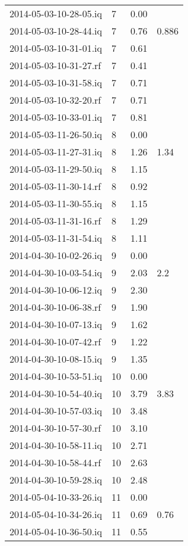 \begin{center}
\begin{longtable}{@{}l l l l@{}}
		2014-05-03-10-28-05.iq & 7 & 0.00 &  \\ 
		2014-05-03-10-28-44.iq & 7 & 0.76 & 0.886 \\ 
		2014-05-03-10-31-01.iq & 7 & 0.61 &  \\ 
		2014-05-03-10-31-27.rf & 7 & 0.41 &  \\ 
		2014-05-03-10-31-58.iq & 7 & 0.71 &  \\ 
		2014-05-03-10-32-20.rf & 7 & 0.71 &  \\ 
		2014-05-03-10-33-01.iq & 7 & 0.81 &  \\ 
		2014-05-03-11-26-50.iq & 8 & 0.00 &  \\ 
		2014-05-03-11-27-31.iq & 8 & 1.26 & 1.34 \\ 
		2014-05-03-11-29-50.iq & 8 & 1.15 &  \\ 
		2014-05-03-11-30-14.rf & 8 & 0.92 &  \\ 
		2014-05-03-11-30-55.iq & 8 & 1.15 &  \\ 
		2014-05-03-11-31-16.rf & 8 & 1.29 &  \\ 
		2014-05-03-11-31-54.iq & 8 & 1.11 &  \\ 
		2014-04-30-10-02-26.iq & 9 & 0.00 &  \\ 
		2014-04-30-10-03-54.iq & 9 & 2.03 & 2.2 \\ 
		2014-04-30-10-06-12.iq & 9 & 2.30 &  \\ 
		2014-04-30-10-06-38.rf & 9 & 1.90 &  \\ 
		2014-04-30-10-07-13.iq & 9 & 1.62 &  \\ 
		2014-04-30-10-07-42.rf & 9 & 1.22 &  \\ 
		2014-04-30-10-08-15.iq & 9 & 1.35 &  \\ 
		2014-04-30-10-53-51.iq & 10 & 0.00 &  \\ 
		2014-04-30-10-54-40.iq & 10 & 3.79 & 3.83 \\ 
		2014-04-30-10-57-03.iq & 10 & 3.48 &  \\ 
		2014-04-30-10-57-30.rf & 10 & 3.10 &  \\ 
		2014-04-30-10-58-11.iq & 10 & 2.71 &  \\ 
		2014-04-30-10-58-44.rf & 10 & 2.63 &  \\ 
		2014-04-30-10-59-28.iq & 10 & 2.48 &  \\ 
		2014-05-04-10-33-26.iq & 11 & 0.00 &  \\ 
		2014-05-04-10-34-26.iq & 11 & 0.69 & 0.76 \\ 
		2014-05-04-10-36-50.iq & 11 & 0.55 &  \\ 

\end{longtable}
\end{center}
